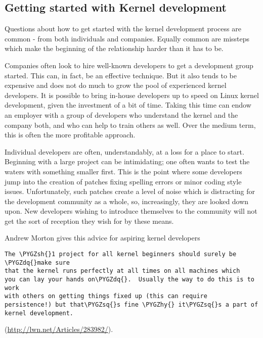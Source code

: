 \documentclass[a4paper,8pt,english]{sphinxmanual}
\def\PYGZsh{\char`\#}
\def\PYGZhy{\char`\-}
\def\PYGZsq{\char`\'}
\def\PYGZdq{\char`\"}
\renewcommand\PYGZsq{\textquotesingle}
\begin{document}
\subsection{Getting started with Kernel development}
\label{process/2.Process:getting-started-with-kernel-development}
Questions about how to get started with the kernel development process are
common - from both individuals and companies.  Equally common are missteps
which make the beginning of the relationship harder than it has to be.

Companies often look to hire well-known developers to get a development
group started.  This can, in fact, be an effective technique.  But it also
tends to be expensive and does not do much to grow the pool of experienced
kernel developers.  It is possible to bring in-house developers up to speed
on Linux kernel development, given the investment of a bit of time.  Taking
this time can endow an employer with a group of developers who understand
the kernel and the company both, and who can help to train others as well.
Over the medium term, this is often the more profitable approach.

Individual developers are often, understandably, at a loss for a place to
start.  Beginning with a large project can be intimidating; one often wants
to test the waters with something smaller first.  This is the point where
some developers jump into the creation of patches fixing spelling errors or
minor coding style issues.  Unfortunately, such patches create a level of
noise which is distracting for the development community as a whole, so,
increasingly, they are looked down upon.  New developers wishing to
introduce themselves to the community will not get the sort of reception
they wish for by these means.

Andrew Morton gives this advice for aspiring kernel developers

\begin{Verbatim}[commandchars=\\\{\}]
The \PYGZsh{}1 project for all kernel beginners should surely be \PYGZdq{}make sure
that the kernel runs perfectly at all times on all machines which
you can lay your hands on\PYGZdq{}.  Usually the way to do this is to work
with others on getting things fixed up (this can require
persistence!) but that\PYGZsq{}s fine \PYGZhy{} it\PYGZsq{}s a part of kernel development.
\end{Verbatim}

(\href{http://lwn.net/Articles/283982/}{http://lwn.net/Articles/283982/}).
\end{document}
